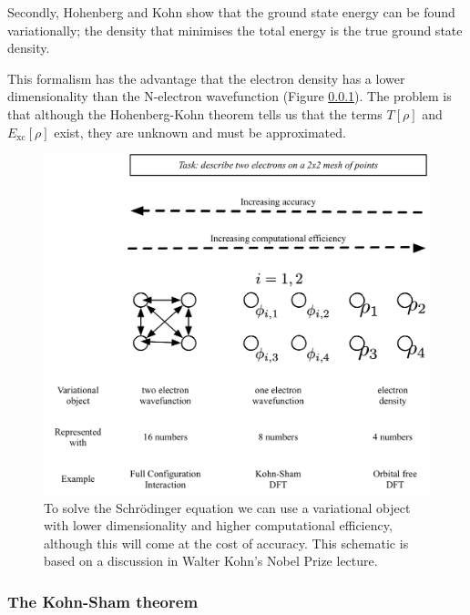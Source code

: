 Secondly, Hohenberg and Kohn show that the ground state energy can be found variationally; the density that minimises the total energy is the true ground state density.

This formalism has the advantage that the electron density has a lower dimensionality than the N-electron wavefunction (Figure \ref{}). The problem is that although the Hohenberg-Kohn theorem tells us that the terms $T\left[\rho\right]$ and $E_{\textrm{xc}}\left[\rho\right]$ exist, they are unknown and must be approximated.

\begin{figure}[h]
\centering
  \includegraphics[width=1.0\columnwidth]{figures/ch3/dimensions.png}
  \caption[Dimensionality of variational objects]{To solve the Schr\"{o}dinger equation we can use a variational object with lower dimensionality and higher computational efficiency, although this will come at the cost of accuracy. This schematic is based on a discussion in Walter Kohn's Nobel Prize lecture.\autocite{Kohn1999}}
  \label{decouple}
\end{figure}


\subsubsection{The Kohn-Sham theorem} 

